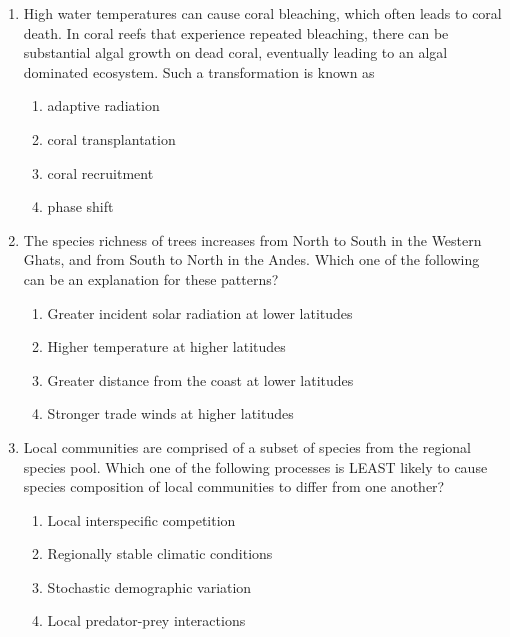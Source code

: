\documentclass[journal]{IEEEtran}
\begin{document}
\begin{enumerate}
    \item High water temperatures can cause coral bleaching, which often leads to coral death.
In coral reefs that experience repeated bleaching, there can be substantial algal growth on dead coral, eventually leading to an algal dominated ecosystem.
Such a transformation is known as
    \begin{multicols}{2}
    \begin{enumerate}
        \item adaptive radiation
        \item coral transplantation
        \item coral recruitment
        \item phase shift
    \end{enumerate}
    \end{multicols}
    
    \item The species richness of trees increases from North to South in the Western Ghats, and from South to North in the Andes.
Which one of the following can be an explanation for these patterns?
\begin{enumerate}
        \item Greater incident solar radiation at lower latitudes
        \item Higher temperature at higher latitudes
        \item Greater distance from the coast at lower latitudes
        \item Stronger trade winds at higher latitudes
    \end{enumerate}
    
    \item Local communities are comprised of a subset of species from the regional species pool.
Which one of the following processes is LEAST likely to cause species composition of local communities to differ from one another?
\begin{enumerate}
        \item Local interspecific competition
        \item Regionally stable climatic conditions
        \item Stochastic demographic variation
        \item Local predator-prey interactions
    \end{enumerate}
    

\end{enumerate}
\end{document}
